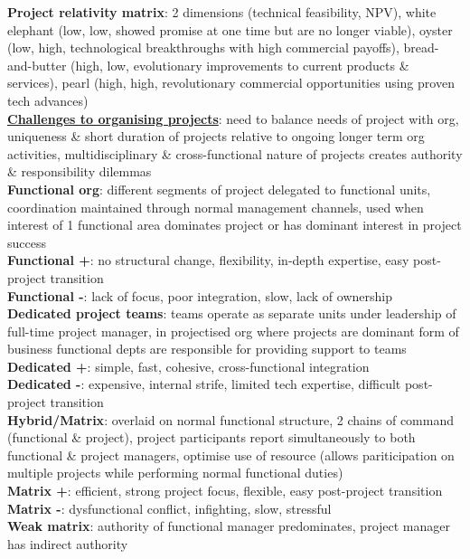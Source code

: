 \documentclass[a4paper]{article}
\begin{document}
\begin{multicols}{3}
        \textbf{Project relativity matrix}: 2 dimensions (technical feasibility, NPV), white elephant (low, low, showed promise at one time but are no longer viable), oyster (low, high, technological breakthroughs with high commercial payoffs), bread-and-butter (high, low, evolutionary improvements to current products \& services), pearl (high, high, revolutionary commercial opportunities using proven tech advances)\\
        \underline{\textbf{Challenges to organising projects}}: need to balance needs of project with org, uniqueness \& short duration of projects relative to ongoing longer term org activities, multidisciplinary \& cross-functional nature of projects creates authority \& responsibility dilemmas\\
        \textbf{Functional org}: different segments of project delegated to functional units, coordination maintained through normal management channels, used when interest of 1 functional area dominates project or has dominant interest in project success\\
        \textbf{Functional +}: no structural change, flexibility, in-depth expertise, easy post-project transition\\
        \textbf{Functional -}: lack of focus, poor integration, slow, lack of ownership\\
        \textbf{Dedicated project teams}: teams operate as separate units under leadership of full-time project manager, in projectised org where projects are dominant form of business functional depts are responsible for providing support to teams\\
        \textbf{Dedicated +}: simple, fast, cohesive, cross-functional integration\\
        \textbf{Dedicated -}: expensive, internal strife, limited tech expertise, difficult post-project transition\\
        \textbf{Hybrid/Matrix}: overlaid on normal functional structure, 2 chains of command (functional \& project), project participants report simultaneously to both functional \& project managers, optimise use of resource (allows pariticipation on multiple projects while performing normal functional duties)\\
        \textbf{Matrix +}: efficient, strong project focus, flexible, easy post-project transition\\
        \textbf{Matrix -}: dysfunctional conflict, infighting, slow, stressful\\
        \textbf{Weak matrix}: authority of functional manager predominates, project manager has indirect authority\\

\end{multicols}
\end{document}
